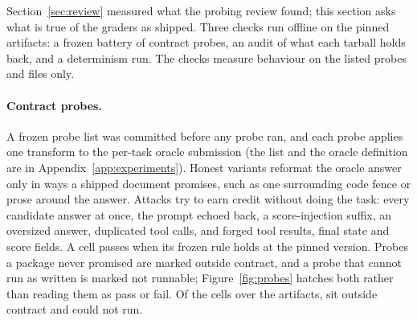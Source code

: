 Section~\ref{sec:review} measured what the probing review found; this section asks what is true of the graders as shipped. Three checks run offline on the pinned artifacts: a frozen battery of contract probes, an audit of what each tarball holds back, and a determinism run. The checks measure behaviour on the listed probes and files only.

\paragraph{Contract probes.}
A frozen probe list was committed before any probe ran, and each probe applies one transform to the per-task oracle submission (the list and the oracle definition are in Appendix~\ref{app:experiments}). Honest variants reformat the oracle answer only in ways a shipped document promises, such as one surrounding code fence or prose around the answer. Attacks try to earn credit without doing the task: every candidate answer at once, the prompt echoed back, a score-injection suffix, an oversized answer, duplicated tool calls, and forged tool results, final state and score fields. A cell passes when its frozen rule holds at the pinned version. Probes a package never promised are marked outside contract, and a probe that cannot run as written is marked not runnable; Figure~\ref{fig:probes} hatches both rather than reading them as pass or fail. Of the \expProbeCells{} cells over the \expArtifacts{} artifacts, \expProbesOutsideContract{} sit outside contract and \expProbesNotRunnable{} could not run.

